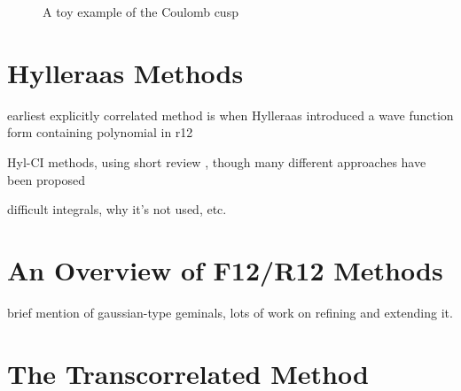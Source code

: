 
\begin{figure}[htbp]
    \centering

    \caption{A toy example of the Coulomb cusp }
    \label{fig:cusp}
\end{figure}

\section{Hylleraas Methods}

earliest explicitly correlated method is when Hylleraas introduced a wave function form containing polynomial in r12\cite{hylleraasNeueBerechnungEnergie1929}
\cite{slaterCentralFieldsRydberg1928}


Hyl-CI methods, using short review \cite{largo-cabrerizoHylleraasCI1987}, though many different approaches have been proposed
\cite{jamesGround1933,kolosAccurate1964,perkinsAtomic1968,perkinsAtomic1969,simsCombined1971,simsOneCenter1971,claryHylleraastype1977,claryCIHylleraas1976}

difficult integrals, why it's not used, etc.


\section{An Overview of F12/R12 Methods}

brief mention of gaussian-type geminals\cite{boysIntegral1960,singerUse1960}, lots of work on refining and extending it.\cite{lesterGaussian1964,mitroyTheory2013,bukowskiNew1994,perssonAccurate1996,panGaussian1970,panElectron1972,szalewiczNew1982,szalewiczAtomic1983,wenzelAtomic1986}


\section{The Transcorrelated Method}
\label{sec:tc}


